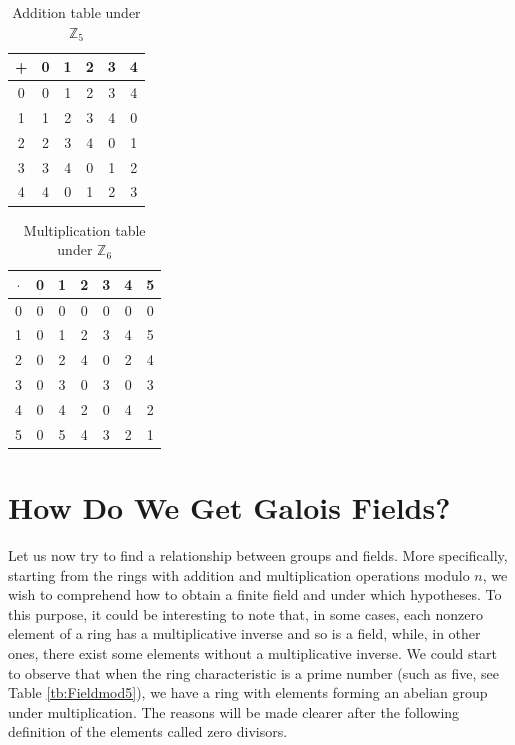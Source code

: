 \begin{table}\centering
\begin{tabular}{c| c c c c c}
+ & 0 & 1 & 2 & 3 & 4\\
\hline
0 & 0 & 1 & 2 & 3 & 4\\
1 & 1 & 2 & 3 & 4 & 0\\
2 & 2 & 3 & 4 & 0 & 1\\
3 & 3 & 4 & 0 & 1 & 2\\
4 & 4 & 0 & 1 & 2 & 3\\
\end{tabular}
\caption{Addition table under \( \mathbb Z_5\)\label{tb:Rmod5}}
\end{table}

\begin{table}\centering
\begin{tabular}{c| c c c c c c}
$\cdot$ & 0 & 1 & 2 & 3 & 4 & 5\\
\hline
0 & 0 & 0 & 0 & 0 & 0 & 0\\
1 & 0 & 1 & 2 & 3 & 4 & 5\\
2 & 0 & 2 & 4 & 0 & 2 & 4\\
3 & 0 & 3 & 0 & 3 & 0 & 3\\
4 & 0 & 4 & 2 & 0 & 4 & 2\\
5 & 0 & 5 & 4 & 3 & 2 & 1\\
\end{tabular}
\caption{Multiplication table under \( \mathbb Z_6\) \label{tb:Ringmod6}}
\end{table}


\section{How Do We Get Galois Fields?} \label{sec:GF}

Let us now try to find a relationship between groups and fields. More specifically, starting from the rings with addition and multiplication operations modulo $n$, we wish to comprehend how to obtain a finite field and under which hypotheses.
To this purpose, it could be interesting to note that, in some cases, each nonzero element of a ring has a multiplicative inverse and so is a field, while, in other ones, there exist some elements without a multiplicative inverse. We could start to observe that when the ring characteristic is a prime number (such as five, see Table \ref{tb:Fieldmod5}), we have a ring with elements forming an abelian group under multiplication. The reasons will be made clearer after the following definition of the elements called zero divisors.


